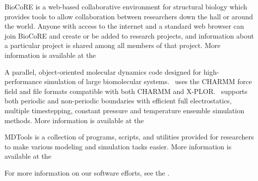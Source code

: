 \begin{itemize}
\LISTITEM{\BIOCORE} 
BioCoRE is a web-based collaborative environment for structural biology
which provides tools to allow collaboration between researchers down the
hall or around the world.  Anyone with access to the internet and a
standard web browser can join BioCoRE and create or be added to research
projects, and information about a particular project is shared among all
members of that project.  More information is available at the 

\LISTITEM{\NAMD} 
A parallel, object-oriented molecular
dynamics code designed for high-performance simulation of large
biomolecular systems.
\NAMD\ uses the CHARMM\mycite{}{} force field and file formats compatible
with both CHARMM and X-PLOR\mycite{}{}.
\NAMD\ supports both periodic and non-periodic boundaries with
efficient full electrostatics, multiple timestepping, constant
pressure and temperature ensemble simulation methods.
More information is available at the


\LISTITEM{\MDTOOLS}
MDTools is a collection of programs, scripts, and utilities provided 
for researchers to make various modeling and simulation tasks easier. 
More information is available at the


\end{itemize}

For more information on our software efforts, see the 
. 


